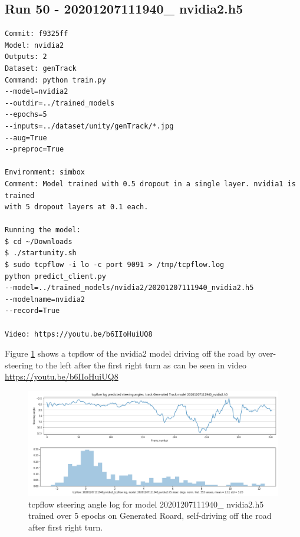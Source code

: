 \subsection{Run 50 - 20201207111940\_ nvidia2.h5}
\begin{verbatim}
Commit: f9325ff
Model: nvidia2
Outputs: 2
Dataset: genTrack
Command: python train.py
--model=nvidia2
--outdir=../trained_models
--epochs=5
--inputs=../dataset/unity/genTrack/*.jpg
--aug=True
--preproc=True

Environment: simbox
Comment: Model trained with 0.5 dropout in a single layer. nvidia1 is trained
with 5 dropout layers at 0.1 each.

Running the model:
$ cd ~/Downloads
$ ./startunity.sh
$ sudo tcpflow -i lo -c port 9091 > /tmp/tcpflow.log
python predict_client.py
--model=../trained_models/nvidia2/20201207111940_nvidia2.h5
--modelname=nvidia2
--record=True

Video: https://youtu.be/b6IIoHuiUQ8

\end{verbatim}

Figure \ref{fig:20201207111940_nvidia2_tcpflow} shows a tcpflow of the nvidia2 model driving off the road by over-steering to the left after the first right turn as can be seen in video \url{https://youtu.be/b6IIoHuiUQ8} 

\begin{figure}[ht]
 \centering 
 \includegraphics[width=\textwidth]{Figures/20201207111940_nvidia2_tcpflow.png}
 \caption{tcpflow steering angle log for model 20201207111940\_ nvidia2.h5 trained over 5 epochs on Generated Roard, self-driving off the road after first right turn.}
 \label{fig:20201207111940_nvidia2_tcpflow}
\end{figure}


